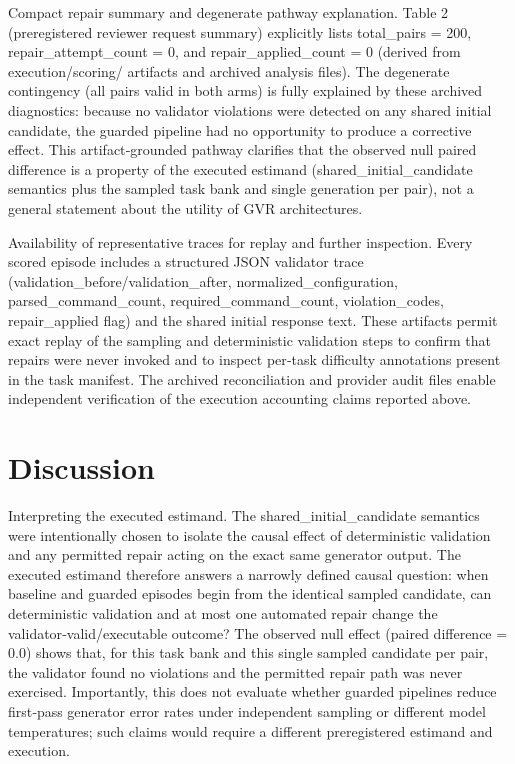 \documentclass[conference]{IEEEtran}
\begin{document}
Compact repair summary and degenerate pathway explanation. Table 2 (preregistered reviewer request summary) explicitly lists total\_pairs = 200, repair\_attempt\_count = 0, and repair\_applied\_count = 0 (derived from execution/scoring/ artifacts and archived analysis files). The degenerate contingency (all pairs valid in both arms) is fully explained by these archived diagnostics: because no validator violations were detected on any shared initial candidate, the guarded pipeline had no opportunity to produce a corrective effect. This artifact‑grounded pathway clarifies that the observed null paired difference is a property of the executed estimand (shared\_initial\_candidate semantics plus the sampled task bank and single generation per pair), not a general statement about the utility of GVR architectures.

Availability of representative traces for replay and further inspection. Every scored episode includes a structured JSON validator trace (validation\_before/validation\_after, normalized\_configuration, parsed\_command\_count, required\_command\_count, violation\_codes, repair\_applied flag) and the shared initial response text. These artifacts permit exact replay of the sampling and deterministic validation steps to confirm that repairs were never invoked and to inspect per‑task difficulty annotations present in the task manifest. The archived reconciliation and provider audit files enable independent verification of the execution accounting claims reported above.

\section{Discussion}
Interpreting the executed estimand. The shared\_initial\_candidate semantics were intentionally chosen to isolate the causal effect of deterministic validation and any permitted repair acting on the exact same generator output. The executed estimand therefore answers a narrowly defined causal question: when baseline and guarded episodes begin from the identical sampled candidate, can deterministic validation and at most one automated repair change the validator‑valid/executable outcome? The observed null effect (paired difference = 0.0) shows that, for this task bank and this single sampled candidate per pair, the validator found no violations and the permitted repair path was never exercised. Importantly, this does not evaluate whether guarded pipelines reduce first‑pass generator error rates under independent sampling or different model temperatures; such claims would require a different preregistered estimand and execution.
\end{document}
